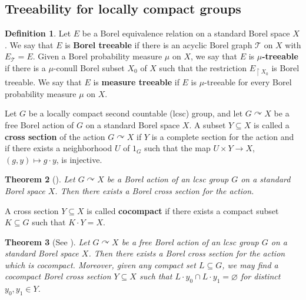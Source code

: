 \documentclass[11pt]{amsart}
\theoremstyle{definition}
\newtheorem{definition}{Definition}[section]
\theoremstyle{plain}
\newtheorem{theorem}[definition]{Theorem}
\newcommand{\<}{\langle}
\renewcommand{\>}{\rangle}
\renewcommand{\emptyset}{\varnothing}
\newcommand{\Tgraph}{\mathcal{T}}
\newcommand{\define}[1]{\textbf{#1}}
\begin{document}
\newpage
\begin{appendices}

\section{Treeability for locally compact groups}\label{sec:lcsc}
\label{sect: Treeability for locally compact groups}

\begin{definition}\label{def:BorelTreeable}
Let $E$ be a Borel equivalence relation on a standard Borel space $X$. We say that $E$ is \define{Borel treeable} if there is an acyclic Borel graph $\Tgraph$ on $X$ with $E_{\Tgraph} = E$. 
Given a Borel probability measure $\mu$ on $X$, we say that $E$ is \define{$\mu$-treeable} if there is a $\mu$-conull Borel subset $X_0$ of $X$ such that the restriction $E_{\restriction X_0}$ is Borel treeable. We say that $E$ is \define{measure treeable} if $E$ is $\mu$-treeable for every Borel probability measure $\mu$ on $X$.
\end{definition}

Let $G$ be a locally compact second countable (lcsc) group, and let
$G\curvearrowright X$ be a free Borel action of $G$ on a standard Borel
space $X$. A subset $Y\subseteq X$ is called a \define{cross section} of the action $G\curvearrowright X$ if $Y$ is a complete section for the action and if there exists a neighborhood $U$ of $1_G$ such that the map $U\times Y \rightarrow X$, $(g,y)\mapsto g\cdot y$, is injective.

\begin{theorem}[\cite{Ke92}]\label{thm:cross}
Let $G\curvearrowright X$ be a Borel action of an lcsc group $G$ on a standard Borel space $X$. Then there exists a Borel cross section for the action.
\end{theorem}


A cross section $Y\subseteq X$ is called \define{cocompact} if there exists a compact subset $K\subseteq G$ such that $K\cdot Y = X$.

\begin{theorem}[See {\cite[\S 2]{Sl17}}]
\label{thm:cocomp}
Let $G\curvearrowright X$ be a free Borel action of an lcsc group $G$ on a standard Borel space $X$. Then there exists a Borel cross section for the action which is cocompact. Moreover, given any compact set $L\subseteq G$, we may find a cocompact Borel cross section $Y\subseteq X$ such that $L\cdot y_0 \cap L\cdot y_1 = \emptyset$ for distinct $y_0,y_1\in Y$.
\end{theorem}


\end{appendices}
\end{document}
